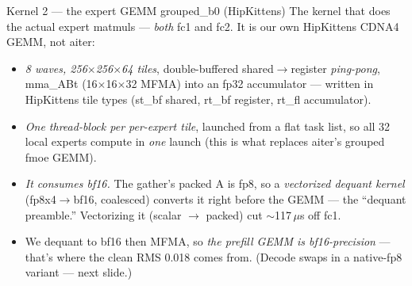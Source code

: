 \documentclass[pdf,aspectratio=169]{beamer}
\newcommand{\empy}[1]{{\color{darkorange}\emph{#1}}}
\newcommand{\empr}[1]{{\color{cardinalred}\emph{#1}}}
\newcommand{\mc}[1]{{\ttfamily\small #1}}
\begin{document}
\begin{frame}{Kernel 2 --- the expert GEMM \mc{grouped\_b0} (HipKittens)}
\footnotesize
The kernel that does the actual expert matmuls --- \emph{both} fc1 and fc2. It is our own HipKittens CDNA4 GEMM, not aiter:
\begin{itemize}\footnotesize
  \item \empy{8 waves, 256$\times$256$\times$64 tiles}, double-buffered shared$\to$register \emph{ping-pong}, \mc{mma\_ABt} (16$\times$16$\times$32 MFMA) into an fp32 accumulator --- written in HipKittens tile types (\mc{st\_bf} shared, \mc{rt\_bf} register, \mc{rt\_fl} accumulator).
  \item \empr{One thread-block per per-expert tile}, launched from a flat task list, so all 32 local experts compute in \emph{one} launch (this is what replaces aiter's grouped \mc{fmoe} GEMM).
  \item \empr{It consumes bf16.} The gather's packed A is fp8, so a \empy{vectorized dequant kernel} (\mc{fp8x4}$\to$\mc{bf16}, coalesced) converts it right before the GEMM --- the ``dequant preamble.'' Vectorizing it (scalar $\to$ packed) cut $\sim$117\,$\mu$s off fc1.
  \item We dequant to bf16 then MFMA, so \empy{the prefill GEMM is bf16-precision} --- that's where the clean RMS 0.018 comes from. (Decode swaps in a native-fp8 variant --- next slide.)
\end{itemize}
\end{frame}
\end{document}
